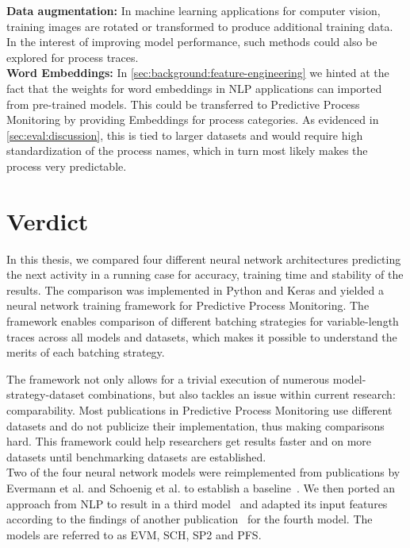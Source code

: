 \noindent\textbf{Data augmentation:} In machine learning applications for computer vision, training images are rotated or transformed to produce additional training data. In the interest of improving model performance, such methods could also be explored for process traces.\\

\noindent\textbf{Word Embeddings:} In \autoref{sec:background:feature-engineering} we hinted at the fact that the weights for word embeddings in NLP applications can imported from pre-trained models. This could be transferred to Predictive Process Monitoring by providing Embeddings for process categories. As evidenced in \autoref{sec:eval:discussion}, this is tied to larger datasets and would require high standardization of the process names, which in turn most likely makes the process very predictable.

\section{Verdict} \label{sec:conclusion:verdict}
In this thesis, we compared four different neural network architectures predicting the next activity in a running case for accuracy, training time and stability of the results. The comparison was implemented in Python and Keras and yielded a neural network training framework for Predictive Process Monitoring. The framework enables comparison of different batching strategies for variable-length traces across all models and datasets, which makes it possible to understand the merits of each batching strategy.

The framework not only allows for a trivial execution of numerous model-strategy-dataset combinations, but also tackles an issue within current research: comparability. Most publications in Predictive Process Monitoring use different datasets and do not publicize their implementation, thus making comparisons hard. This framework could help researchers get results faster and on more datasets until benchmarking datasets are established.\\

Two of the four neural network models were reimplemented from publications by Evermann et al. and Schoenig et al. to establish a baseline~\cite{evermann2016, schoenig2018}. We then ported an approach from NLP to result in a third model~\cite{shibata2016bipartite} and adapted its input features according to the findings of another publication~\cite{klinkmuller2018reliablemonitoring} for the fourth model. The models are referred to as EVM, SCH, SP2 and PFS.

